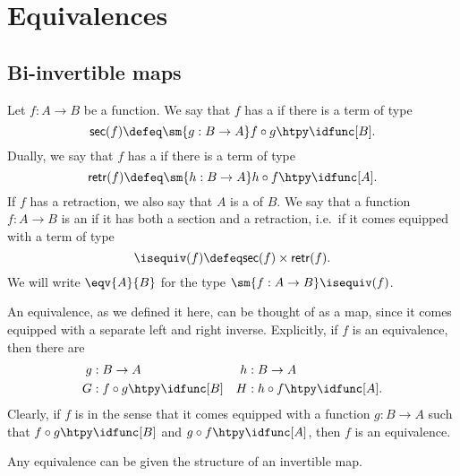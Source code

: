 \chapter{Equivalences}

\section{Bi-invertible maps}

\begin{defn}
Let $f:A\to B$ be a function. We say that $f$ has a  if there is a term of type
\begin{equation*}
\mathsf{sec}(f) \defeq \sm{g:B\to A} f\circ g\htpy \idfunc[B].
\end{equation*}
Dually, we say that $f$ has a  if there is a term of type
\begin{equation*}
\mathsf{retr}(f) \defeq \sm{h:B\to A} h\circ f\htpy \idfunc[A].
\end{equation*}
If $f$ has a retraction, we also say that $A$ is a  of $B$.
We say that a function $f:A\to B$ is an  if it has both a section and a retraction, i.e.~if it comes equipped with a term of type
\begin{equation*}
\isequiv(f)\defeq\mathsf{sec}(f)\times\mathsf{retr}(f).
\end{equation*}
We will write $\eqv{A}{B}$ for the type $\sm{f:A\to B}\isequiv(f)$.
\end{defn}

\begin{rmk}
An equivalence, as we defined it here, can be thought of as a  map, since it comes equipped with a separate left and right inverse. Explicitly, if $f$ is an equivalence, then there are
\begin{align*}
g & : B\to A & h & : B\to A \\
G & : f\circ g \htpy \idfunc[B] & H & : h\circ f \htpy \idfunc[A].
\end{align*}
Clearly, if $f$ is  in the sense that it comes equipped with a function $g:B\to A$ such that $f\circ g\htpy\idfunc[B]$ and $g\circ f\htpy\idfunc[A]$, then $f$ is an equivalence.
\end{rmk}

\begin{defn}\label{defn:inv_equiv}
Any equivalence can be given the structure of an invertible map.
\end{defn}

